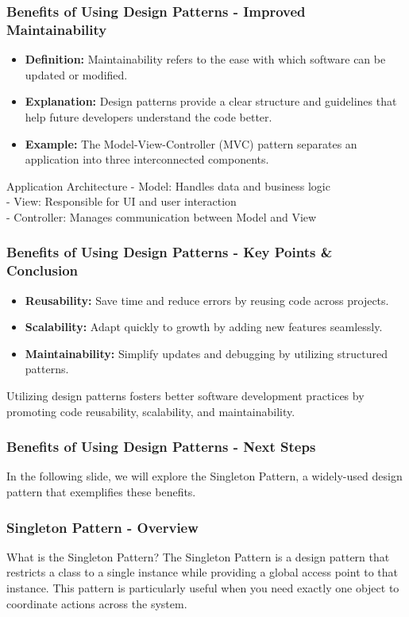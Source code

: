 \documentclass{beamer}
\begin{document}
\begin{frame}[fragile]
    \frametitle{Benefits of Using Design Patterns - Improved Maintainability}
    \begin{itemize}
        \item \textbf{Definition:} Maintainability refers to the ease with which software can be updated or modified.
        \item \textbf{Explanation:} Design patterns provide a clear structure and guidelines that help future developers understand the code better.
        \item \textbf{Example:} The Model-View-Controller (MVC) pattern separates an application into three interconnected components.
    \end{itemize}
    \begin{block}{Application Architecture}
        - Model: Handles data and business logic \\
        - View: Responsible for UI and user interaction \\
        - Controller: Manages communication between Model and View
    \end{block}
\end{frame}

\begin{frame}[fragile]
    \frametitle{Benefits of Using Design Patterns - Key Points & Conclusion}
    \begin{itemize}
        \item \textbf{Reusability:} Save time and reduce errors by reusing code across projects.
        \item \textbf{Scalability:} Adapt quickly to growth by adding new features seamlessly.
        \item \textbf{Maintainability:} Simplify updates and debugging by utilizing structured patterns.
    \end{itemize}
    Utilizing design patterns fosters better software development practices by promoting code reusability, scalability, and maintainability.
\end{frame}

\begin{frame}[fragile]
    \frametitle{Benefits of Using Design Patterns - Next Steps}
    In the following slide, we will explore the Singleton Pattern, a widely-used design pattern that exemplifies these benefits.
\end{frame}

\begin{frame}[fragile]
    \frametitle{Singleton Pattern - Overview}
    \begin{block}{What is the Singleton Pattern?}
    The Singleton Pattern is a design pattern that restricts a class to a single instance while providing a global access point to that instance. This pattern is particularly useful when you need exactly one object to coordinate actions across the system.
    \end{block}
\end{frame}
\end{document}
